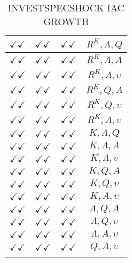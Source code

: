 \documentclass[a4paper,10pt]{article}
\begin{document}
\begin{longtable}{|c|c|c|c|}
\hline
$\checkmark\checkmark$ & $\checkmark\checkmark$ & $\checkmark\checkmark$ & ${R^{K}},{\Lambda},{Q}$ \\
\hline
$\checkmark\checkmark$ & $\checkmark\checkmark$ & $\checkmark\checkmark$ & ${R^{K}},{\Lambda},{A}$ \\
\hline
$\checkmark\checkmark$ & $\checkmark\checkmark$ & $\checkmark\checkmark$ & ${R^{K}},{\Lambda},{\upsilon}$ \\
\hline
$\checkmark\checkmark$ & $\checkmark\checkmark$ & $\checkmark\checkmark$ & ${R^{K}},{Q},{A}$ \\
\hline
$\checkmark\checkmark$ & $\checkmark\checkmark$ & $\checkmark\checkmark$ & ${R^{K}},{Q},{\upsilon}$ \\
\hline
$\checkmark\checkmark$ & $\checkmark\checkmark$ & $\checkmark\checkmark$ & ${R^{K}},{A},{\upsilon}$ \\
\hline
$\checkmark\checkmark$ & $\checkmark\checkmark$ & $\checkmark\checkmark$ & ${K},{\Lambda},{Q}$ \\
\hline
$\checkmark\checkmark$ & $\checkmark\checkmark$ & $\checkmark\checkmark$ & ${K},{\Lambda},{A}$ \\
\hline
$\checkmark\checkmark$ & $\checkmark\checkmark$ & $\checkmark\checkmark$ & ${K},{\Lambda},{\upsilon}$ \\
\hline
$\checkmark\checkmark$ & $\checkmark\checkmark$ & $\checkmark\checkmark$ & ${K},{Q},{A}$ \\
\hline
$\checkmark\checkmark$ & $\checkmark\checkmark$ & $\checkmark\checkmark$ & ${K},{Q},{\upsilon}$ \\
\hline
$\checkmark\checkmark$ & $\checkmark\checkmark$ & $\checkmark\checkmark$ & ${K},{A},{\upsilon}$ \\
\hline
$\checkmark\checkmark$ & $\checkmark\checkmark$ & $\checkmark\checkmark$ & ${\Lambda},{Q},{A}$ \\
\hline
$\checkmark\checkmark$ & $\checkmark\checkmark$ & $\checkmark\checkmark$ & ${\Lambda},{Q},{\upsilon}$ \\
\hline
$\checkmark\checkmark$ & $\checkmark\checkmark$ & $\checkmark\checkmark$ & ${\Lambda},{A},{\upsilon}$ \\
\hline
$\checkmark\checkmark$ & $\checkmark\checkmark$ & $\checkmark\checkmark$ & ${Q},{A},{\upsilon}$ \\
\hline
\caption{INVESTSPECSHOCK IAC GROWTH}
\label{table:MyTableLabel}
\end{longtable}
\end{document}
